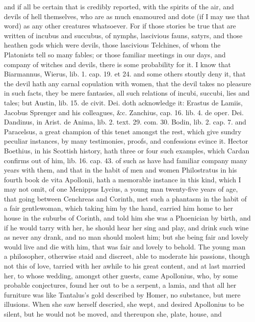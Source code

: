 {and if all be certain that is credibly reported, with the spirits of
the air, and devils of hell themselves, who are as much enamoured and
dote (if I may use that word) as any other creatures whatsoever. For if
those stories be true that are written of incubus and succubus, of
nymphs, lascivious fauns, satyrs, and those heathen gods which were
devils, those lascivious Telchines, of whom the Platonists tell so many
fables; or those familiar meetings in our days, and company of witches
and devils, there is some probability for it. I know that Biarmannus,
Wierus, lib. 1. cap. 19. et 24. and some others stoutly deny it, that
the devil hath any carnal copulation with women, that the devil takes
no pleasure in such facts, they be mere fantasies, all such relations
of incubi, succubi, lies and tales; but Austin, lib. 15. de civit. Dei.
doth acknowledge it: Erastus de Lamiis, Jacobus Sprenger and his
colleagues, \&c.  Zanchius, cap. 16. lib. 4. de oper. Dei.
Dandinus, in Arist. de Anima, lib. 2. text. 29. com. 30. Bodin, lib. 2.
cap. 7. and Paracelsus, a great champion of this tenet amongst the
rest, which give sundry peculiar instances, by many testimonies,
proofs, and confessions evince it. Hector Boethius, in his Scottish
history, hath three or four such examples, which Cardan confirms out of
him, lib. 16. cap. 43. of such as have had familiar company many years
with them, and that in the habit of men and women Philostratus in his
fourth book de vita Apollonii, hath a memorable instance in this kind,
which I may not omit, of one Menippus Lycius, a young man twenty-five
years of age, that going between Cenchreas and Corinth, met such a
phantasm in the habit of a fair gentlewoman, which taking him by the
hand, carried him home to her house in the suburbs of Corinth, and told
him she was a Phoenician by birth, and if he would tarry with her,
he should hear her sing and play, and drink such wine as never
any drank, and no man should molest him; but she being fair and lovely
would live and die with him, that was fair and lovely to behold. The
young man a philosopher, otherwise staid and discreet, able to moderate
his passions, though not this of love, tarried with her awhile to his
great content, and at last married her, to whose wedding, amongst other
guests, came Apollonius, who, by some probable conjectures, found her
out to be a serpent, a lamia, and that all her furniture was like
Tantalus's gold described by Homer, no substance, but mere illusions.
When she saw herself descried, she wept, and desired Apollonius to be
silent, but he would not be moved, and thereupon she, plate, house, and
}
